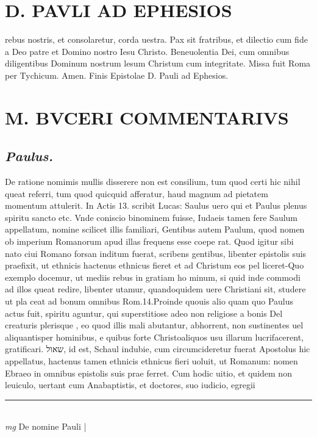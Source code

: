 \documentclass{article}
\begin{document}
\begin{pages}
\section*{D. PAVLI AD EPHESIOS }
\marginpar{[ p.9.  ]}\pstart rebus nostris, et consolaretur, corda uestra.  Pax sit fratribus, et dilectio cum fide a Deo patre et Domino nostro Iesu Christo. Beneuolentia Dei, cum omnibus diligentibus Dominum nostrum lesum Christum cum integritate. Missa fuit Roma per Tychicum. Amen.  Finis Epistolae D. Pauli ad Ephesios.  \pend
\section*{M. BVCERI COMMENTARIVS }
\marginpar{[ p.17 ]}
{}
\subsection*{\textit{Paulus. }}\pstart De ratione nomimis mullis disserere non est consilium, tum quod certi hic nihil queat referri, tum quod quicquid afferatur, haud magnum ad pietatem momentum attulerit. In Actis 13. scribit Lucas: Saulus uero qui et Paulus plenus spiritu sancto etc. Vnde coniscio binominem fuisse, Iudaeis tamen fere Saulum appellatum, nomine scilicet illis familiari, Gentibus autem Paulum, quod nomen ob imperium Romanorum apud illas frequens esse coepe rat. Quod igitur sibi nato ciui Romano forsan inditum fuerat, scribens gentibus, libenter epistolis suis praefixit, ut ethnicis hactenus ethnicus fieret et ad Christum eos pel liceret-Quo exemplo docemur, ut mediis rebus in gratiam ho minum, si quid inde commodi ad illos queat redire, libenter utamur, quandoquidem uere Christiani sit, studere ut pla ceat ad bonum omnibus Rom.14.Proinde quouis alio quam quo Paulus actus fuit, spiritu aguntur, qui superstitiose adeo non religiose a bonis Del creaturis plerisque , eo quod illis mali abutantur, abhorrent, non sustinentes uel aliquantisper hominibus, e quibus forte Christoaliquos usu illarum lucrifacerent, gratificari. שאול, id est, Schaul indubie, cum circumcideretur fuerat Apostolus hic appellatus, hactenus tamen ethnicis ethnicus fieri uoluit, ut Romanum: nomen Ebraeo in omnibus epistolis suis prae ferret. Cum hodic uitio, et quidem non leuiculo, uertant cum Anabaptistis, et doctores, suo iudicio, egregii  \pend
\vspace{0.5cm}\noindent
\vspace{0.2cm}\rule{1cm}{0.2pt}\\ 
\hspace{0.2cm}\textit{mg}
\footnotesize De nomine Pauli
\normalsize| 

\end{pages}
\end{document}
